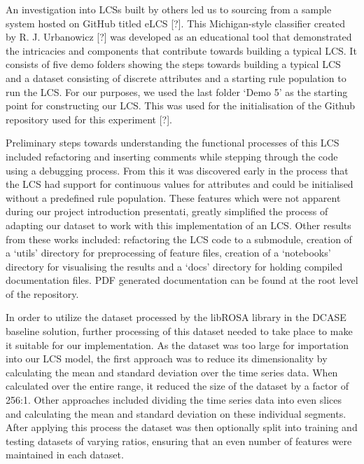 \documentclass[11pt]{article}
\begin{document}
An investigation into LCSs built by others led us to sourcing from a sample system hosted on GitHub titled eLCS [?]. This Michigan-style classifier created by R. J. Urbanowicz [?] was developed as an educational tool that demonstrated the intricacies and components that contribute towards building a typical LCS. It consists of five demo folders showing the steps towards building a typical LCS and a dataset consisting of discrete attributes and a starting rule population to run the LCS. For our purposes, we used the last folder `Demo 5' as the starting point for constructing our LCS. This was used for the initialisation of the Github repository used for this experiment [?].

Preliminary steps towards understanding the functional processes of this LCS included refactoring and inserting comments while stepping through the code using a debugging process. From this it was discovered early in the process that the LCS had support for continuous values for attributes and could be initialised without a predefined rule population. These features which were not apparent during our project introduction presentati, greatly simplified the process of adapting our dataset to work with this implementation of an LCS. Other results from these works included: refactoring the LCS code to a submodule, creation of a `utils' directory for preprocessing of feature files, creation of a `notebooks' directory for visualising the results and a `docs' directory for holding compiled documentation files. PDF generated documentation can be found at the root level of the repository.

In order to utilize the dataset processed by the libROSA library in the DCASE baseline solution, further processing of this dataset needed to take place to make it suitable for our implementation. As the dataset was too large for importation into our LCS model, the first approach was to reduce its dimensionality by calculating the mean and standard deviation over the time series data. When calculated over the entire range, it reduced the size of the dataset by a factor of 256:1. Other approaches included dividing the time series data into even slices and calculating the mean and standard deviation on these individual segments. After applying this process the dataset was then optionally split into training and testing datasets of varying ratios, ensuring that an even number of features were maintained in each dataset.
\end{document}
